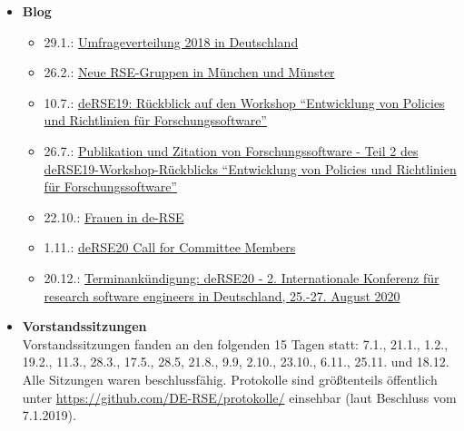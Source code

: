 \begin{itemize}
 \item \textbf{Blog}
 \begin{itemize}
  \item 29.1.: \href{https://www.de-rse.org/blog/2019/01/29/umfrageverteilung-2018-in-deutschland.html}{Umfrageverteilung 2018 in Deutschland}
  \item 26.2.: \href{https://www.de-rse.org/blog/2019/02/26/new-rse-groups-meet-in-munich-and-muenster.html}{Neue RSE-Gruppen in München und Münster}
  \item 10.7.: \href{https://de-rse.org/blog/2019/07/10/derse19-ws-policies-1.html}{deRSE19: Rückblick auf den Workshop ``Entwicklung von Policies und Richtlinien für Forschungssoftware''}
  \item 26.7.: \href{https://de-rse.org/blog/2019/07/26/derse19-ws-policies-2.html}{Publikation und Zitation von Forschungssoftware - Teil 2 des deRSE19-Workshop-Rückblicks ``Entwicklung von Policies und Richtlinien für Forschungssoftware''}
  \item 22.10.: \href{https://de-rse.org/blog/2019/10/22/frauen-in-derse.html}{Frauen in de-RSE}
  \item 1.11.: \href{https://de-rse.org/blog/2019/11/01/derse20-call-for-committee-members.html}{deRSE20 Call for Committee Members}
  \item 20.12.: \href{https://de-rse.org/blog/2019/12/20/derse20-terminankuendigung.html}{Terminankündigung: deRSE20 - 2. Internationale Konferenz für research software engineers in Deutschland, 25.-27. August 2020}
 \end{itemize}
 \item \textbf{Vorstandssitzungen}\\
  Vorstandssitzungen fanden an den folgenden 15 Tagen statt: 7.1., 21.1., 1.2., 19.2., 11.3., 28.3., 17.5., 28.5, 21.8., 9.9, 2.10., 23.10., 6.11., 25.11. und 18.12. Alle Sitzungen waren beschlussfähig. Protokolle sind größtenteils öffentlich unter \href{https://github.com/DE-RSE/protokolle/}{https://github.com/DE-RSE/protokolle/} einsehbar (laut Beschluss vom 7.1.2019).
\end{itemize}




